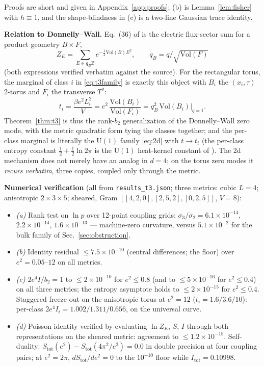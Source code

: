 \documentclass[11pt]{article}
\theoremstyle{remark}
\theoremstyle{plain}
\newcommand{\Z}{\mathbb{Z}}
\begin{document}
Proofs are short and given in Appendix~\ref{app:proofs}; (b) is Lemma~\ref{lem:fisher} with $h \equiv 1$, and the shape-blindness in (c) is a two-line Gaussian trace identity.

\textbf{Relation to Donnelly--Wall.} Eq.~(36) of \cite{DW16} is the electric flux-sector sum for a product geometry $B \times F$,
\[
Z_E = \sum_{E \in q_B \Z} e^{-\frac12 \mathrm{Vol}(B) E^2}, \qquad q_B = q/\sqrt{\mathrm{Vol}(F)}
\]
(both expressions verified verbatim against the source). For the rectangular torus, the marginal of class $i$ in \eqref{eq:t3family} is exactly this object with $B_i$ the $(x_i, \tau)$ 2-torus and $F_i$ the transverse $T^2$:
\[
t_i = \frac{\beta e^2 L_i^2}{V} = e^2\, \frac{\mathrm{Vol}(B_i)}{\mathrm{Vol}(F_i)} = q_B^2\, \mathrm{Vol}(B_i) \Big|_{q=1}.
\]
Theorem~\ref{thm:t3} is thus the rank-$b_2$ generalization of the Donnelly--Wall zero mode, with the metric quadratic form tying the classes together; and the per-class marginal is literally the $\mathrm{U}(1)$ family \eqref{eq:2d} with $t \to t_i$ (the per-class entropy constant $\tfrac12 + \tfrac12\ln 2\pi$ is the $\mathrm{U}(1)$ heat-kernel constant of \cite{P3}). The 2d mechanism does not merely have an analog in $d = 4$; on the torus zero modes it \emph{recurs verbatim}, three copies, coupled only through the metric.

\textbf{Numerical verification} (all from \texttt{results\_t3.json}; three metrics: cubic $L = 4$; anisotropic $2\times3\times5$; sheared, Gram $[[4,2,0],[2,5,2],[0,2,5]]$, $V = 8$):
\begin{itemize}
\item \emph{(a)} Rank test on $\ln p$ over 12-point coupling grids: $\sigma_3/\sigma_2 = 6.1\times10^{-14}$, $2.2\times10^{-14}$, $1.6\times10^{-13}$ --- machine-zero curvature, versus $5.1\times10^{-2}$ for the bulk family of Sec.~\ref{sec:obstruction}.
\item \emph{(b)} Identity residual $\leq 7.5\times10^{-10}$ (central differences; the floor) over $e^2 = 0.05$--$12$ on all metrics.
\item \emph{(c)} $2e^4 I / b_2 = 1$ to $\leq 2\times10^{-10}$ for $e^2 \leq 0.8$ (and to $\leq 5\times10^{-16}$ for $e^2 \leq 0.4$) on all three metrics; the entropy asymptote holds to $\leq 2\times10^{-15}$ for $e^2 \leq 0.4$. Staggered freeze-out on the anisotropic torus at $e^2 = 12$ ($t_i = 1.6/3.6/10$): per-class $2e^4 I_i = 1.002 / 1.311 / 0.656$, on the universal curve.
\item \emph{(d)} Poisson identity verified by evaluating $\ln Z_E$, $S$, $I$ through both representations on the sheared metric: agreement to $\leq 1.2\times10^{-15}$. Self-duality: $S_{\mathrm{tot}}(e^2) - S_{\mathrm{tot}}(4\pi^2/e^2) = 0.0$ in double precision at four coupling pairs; at $e^2 = 2\pi$, $dS_{\mathrm{tot}}/de^2 = 0$ to the $10^{-10}$ floor while $I_{\mathrm{tot}} = 0.10998$.
\end{itemize}
\end{document}
